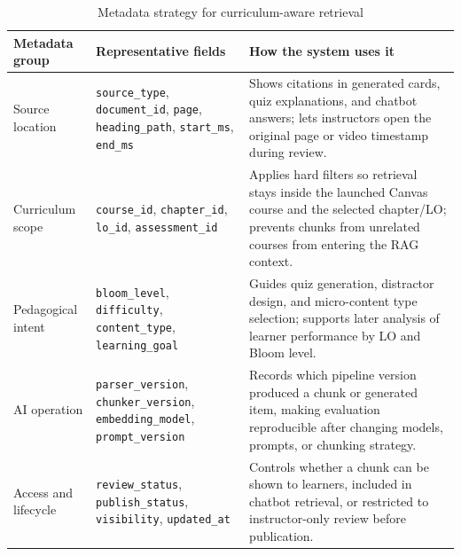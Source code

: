 \begin{table}[H]
    \centering
    \caption{Metadata strategy for curriculum-aware retrieval}
    \label{tab:metadata-strategy-curriculum}
    \footnotesize
    \begin{tabularx}{\textwidth}{
        >{\raggedright\arraybackslash}p{2.7cm}
        >{\raggedright\arraybackslash}p{4.2cm}
        >{\raggedright\arraybackslash}X}
        \toprule
        \textbf{Metadata group} & \textbf{Representative fields} & \textbf{How the system uses it} \\
        \midrule
        Source location
            & \texttt{source\_type}, \texttt{document\_id}, \texttt{page},
              \texttt{heading\_path}, \texttt{start\_ms}, \texttt{end\_ms}
            & Shows citations in generated cards, quiz explanations, and
              chatbot answers; lets instructors open the original page or
              video timestamp during review. \\
        \midrule
        Curriculum scope
            & \texttt{course\_id}, \texttt{chapter\_id}, \texttt{lo\_id},
              \texttt{assessment\_id}
            & Applies hard filters so retrieval stays inside the launched
              Canvas course and the selected chapter/LO; prevents chunks from
              unrelated courses from entering the RAG context. \\
        \midrule
        Pedagogical intent
            & \texttt{bloom\_level}, \texttt{difficulty},
              \texttt{content\_type}, \texttt{learning\_goal}
            & Guides quiz generation, distractor design, and micro-content
              type selection; supports later analysis of learner performance
              by LO and Bloom level. \\
        \midrule
        AI operation
            & \texttt{parser\_version}, \texttt{chunker\_version},
              \texttt{embedding\_model}, \texttt{prompt\_version}
            & Records which pipeline version produced a chunk or generated
              item, making evaluation reproducible after changing models,
              prompts, or chunking strategy. \\
        \midrule
        Access and lifecycle
            & \texttt{review\_status}, \texttt{publish\_status},
              \texttt{visibility}, \texttt{updated\_at}
            & Controls whether a chunk can be shown to learners, included in
              chatbot retrieval, or restricted to instructor-only review
              before publication. \\
        \bottomrule
    \end{tabularx}
\end{table}

